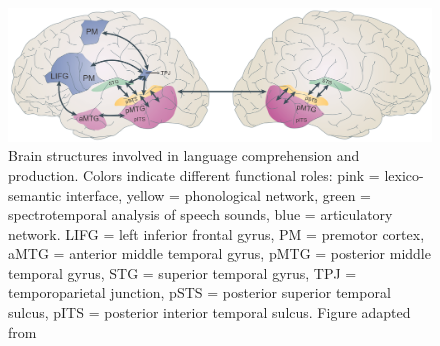 \begin{figure}[!ht]
	\centering
	\includegraphics[width=.9\textwidth, clip=true]{./Chapters/01_Introduction/Images/Language_network_all_labels}
	\caption{Brain structures involved in language comprehension and production. Colors indicate different functional roles: pink = lexico-semantic interface, yellow = phonological network, green = spectrotemporal analysis of speech sounds, blue = articulatory network. LIFG = left inferior frontal gyrus, PM = premotor cortex, aMTG = anterior middle temporal gyrus, pMTG = posterior middle temporal gyrus, STG = superior temporal gyrus, TPJ = temporoparietal junction, pSTS = posterior superior temporal sulcus, pITS = posterior interior temporal sulcus. Figure adapted from \citet{hickok2007}}
    \vspace*{-10pt}
	\label{fig:language}
\end{figure}